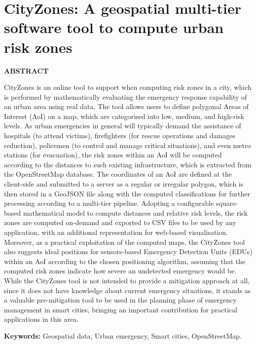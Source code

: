 \chapter{CityZones: A geospatial multi-tier software tool to compute urban risk zones}\label{cap:cityzones}

\begin{refsection}

\textbf{ABSTRACT}

CityZones is an online tool to support when computing risk zones in a city, which is performed by mathematically evaluating the emergency response capability of an urban area using real data. The tool allows users to define polygonal Areas of Interest (AoI) on a map, which are categorised into low, medium, and high-risk levels. As urban emergencies in general will typically demand the assistance of hospitals (to attend victims), firefighters (for rescue operations and damages reduction), policemen (to control and manage critical situations), and even metro stations (for evacuation), the risk zones within an AoI will be computed according to the distances to such existing infrastructure, which is extracted from the OpenStreetMap database. The coordinates of an AoI are defined at the client-side and submitted to a server as a regular or irregular polygon, which is then stored in a GeoJSON file along with the computed classifications for further processing according to a multi-tier pipeline. Adopting a configurable square-based mathematical model to compute distances and relative risk levels, the risk zones are computed on-demand and exported to CSV files to be used by any application, with an additional representation for web-based visualisation. Moreover, as a practical exploitation of the computed maps, the CityZones tool also suggests ideal positions for sensors-based Emergency Detection Units (EDUs) within an AoI according to the chosen positioning algorithm, assuming that the computed risk zones indicate how severe an undetected emergency would be. While the CityZones tool is not intended to provide a mitigation approach at all, since it does not have knowledge about current emergency situations, it stands as a valuable pre-mitigation tool to be used in the planning phase of emergency management in smart cities, bringing an important contribution for practical applications in this area.

\textbf{Keywords:} Geospatial data, Urban emergency, Smart cities, OpenStreetMap.


\end{refsection}
